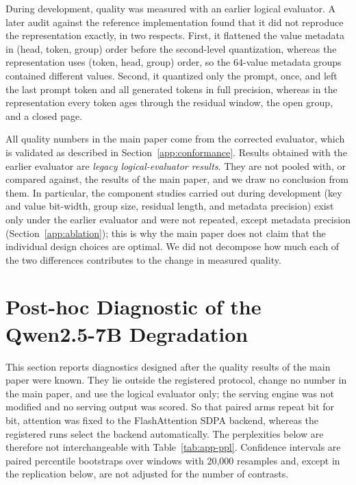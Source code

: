 \documentclass{article}
\begin{document}
During development, quality was measured with an earlier logical evaluator. A later audit against the
reference implementation found that it did not reproduce the representation exactly, in two respects.
First, it flattened the value metadata in (head, token, group) order before the second-level
quantization, whereas the representation uses (token, head, group) order, so the 64-value metadata
groups contained different values. Second, it quantized only the prompt, once, and left the last
prompt token and all generated tokens in full precision, whereas in the representation every token
ages through the residual window, the open group, and a closed page.

All quality numbers in the main paper come from the corrected evaluator, which is validated as
described in Section~\ref{app:conformance}. Results obtained with the earlier evaluator are
\emph{legacy logical-evaluator results}. They are not pooled with, or compared against, the results of
the main paper, and we draw no conclusion from them. In particular, the component studies carried out
during development (key and value bit-width, group size, residual length, and metadata precision) exist
only under the earlier evaluator and were not repeated, except metadata precision
(Section~\ref{app:ablation}); this is why the main paper does not claim that
the individual design choices are optimal. We did not decompose how much each of the two differences
contributes to the change in measured quality.

\section{Post-hoc Diagnostic of the Qwen2.5-7B Degradation}
\label{app:qwen-diagnostic}

This section reports diagnostics designed after the quality results of the main paper were known. They
lie outside the registered protocol, change no number in the main paper, and use the logical evaluator
only; the serving engine was not modified and no serving output was scored. So that paired arms repeat
bit for bit, attention was fixed to the FlashAttention SDPA backend, whereas the registered runs select
the backend automatically. The perplexities below are therefore not interchangeable with
Table~\ref{tab:app-ppl}. Confidence intervals are paired percentile bootstraps over windows with 20,000
resamples and, except in the replication below, are not adjusted for the number of contrasts.
\end{document}
